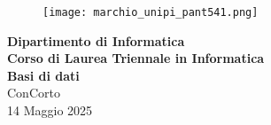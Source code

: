 \begin{titlepage} %
	\begin{figure}[t] %
		\centering\texttt{[image: marchio\_unipi\_pant541.png]}
	\end{figure}
	\vspace{20mm}
	
	\begin{Large}
		\begin{center}
			\textbf{Dipartimento di Informatica\\ Corso di Laurea Triennale in Informatica\\}
			\vspace{20mm}
			{\huge{\bf Basi di dati}}\\
			\vspace{5mm}
			{\LARGE{ConCorto}}\\
			{\large{14 Maggio 2025}}
		\end{center}
	\end{Large}
	
	
	\vspace{36mm}
	
\end{titlepage}